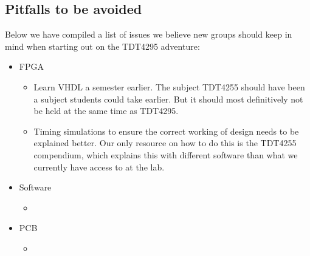 \subsection{Pitfalls to be avoided}\label{conclusion:pitfalls}
Below we have compiled a list of issues we believe new groups should keep in mind when starting out on the TDT4295 adventure:
\begin{itemize}
	\item FPGA
	\begin{itemize}
		\item Learn VHDL a semester earlier. The subject TDT4255 should have been a subject students could take earlier.
But it should most definitively not be held at the same time as TDT4295.
		\item Timing simulations to ensure the correct working of design needs to be explained better.
Our only resource on how to do this is the TDT4255 compendium\cite{}, which explains this with different software than what we currently have access to at the lab.
	\end{itemize}
	\item Software
	\begin{itemize}
		\item
	\end{itemize}
	\item PCB
	\begin{itemize}
		\item
	\end{itemize}
\end{itemize}
